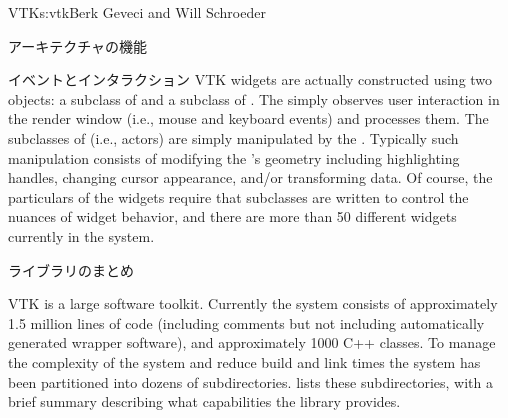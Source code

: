 \begin{aosachapter}{VTK}{s:vtk}{Berk Geveci and Will Schroeder}
\begin{aosasect1}{アーキテクチャの機能}
\begin{aosasect2}{イベントとインタラクション}
VTK widgets are actually constructed using two objects: a subclass of
 and a subclass of . The
 simply observes user interaction in the
render window (i.e., mouse and keyboard events) and processes
them. The subclasses of  (i.e., actors) are simply
manipulated by the . Typically such
manipulation consists of modifying the 's geometry
including highlighting handles, changing cursor appearance, and/or
transforming data. Of course, the particulars of the widgets require
that subclasses are written to control the nuances of widget behavior,
and there are more than 50 different widgets currently in the system.

\end{aosasect2}

\begin{aosasect2}{ライブラリのまとめ}

VTK is a large software toolkit. Currently the system consists of
approximately 1.5 million lines of code (including comments but not
including automatically generated wrapper software), and approximately
1000 C++ classes. To manage the complexity of the system and reduce
build and link times the system has been partitioned into dozens of
subdirectories.  lists these subdirectories,
with a brief summary describing what capabilities the library
provides.


\end{aosasect2}
\end{aosasect1}
\end{aosachapter}
